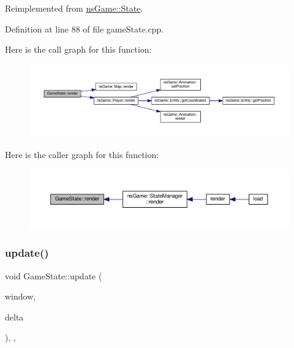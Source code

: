 Reimplemented from \hyperlink{classns_game_1_1_state_a214f8ee52de4b318f1ed3861a578ce67}{ns\+Game\+::\+State}.



Definition at line 88 of file game\+State.\+cpp.

Here is the call graph for this function\+:\nopagebreak
\begin{figure}[H]
\begin{center}
\leavevmode
\includegraphics[width=350pt]{class_game_state_aa3665a5b951ec00ead47902e4c8df627_cgraph}
\end{center}
\end{figure}
Here is the caller graph for this function\+:\nopagebreak
\begin{figure}[H]
\begin{center}
\leavevmode
\includegraphics[width=350pt]{class_game_state_aa3665a5b951ec00ead47902e4c8df627_icgraph}
\end{center}
\end{figure}
\mbox{\label{class_game_state_a1d57727f6910092368b4a1a5a598b0d0}} 
\subsubsection{\texorpdfstring{update()}{update()}}
{\footnotesize\ttfamily void Game\+State\+::update (\begin{DoxyParamCaption}\item[{Min\+GL \&}]{window,  }\item[{unsigned}]{delta }\end{DoxyParamCaption})\hspace{0.3cm}{\ttfamily [inline]}, {\ttfamily [override]}, {\ttfamily [virtual]}}



